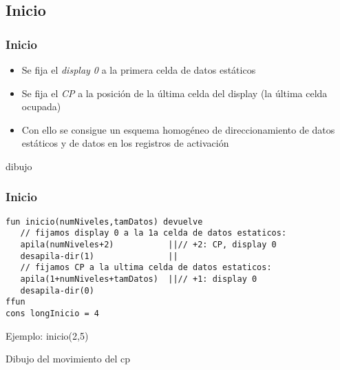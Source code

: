 \documentclass[hyperref={pdfpagelabels=false},tree-dvips]{beamer}
\begin{document}
\subsection{Inicio}
\begin{frame}[fragile]
\frametitle{Inicio}

\begin{itemize}[<+->]%
    \item Se fija el \emph{display 0} a la primera celda de datos estáticos
    \item Se fija el \emph{CP} a la posición de la última celda del display (la última celda ocupada)
    \item Con ello se consigue un esquema homogéneo de direccionamiento de datos estáticos y de datos en los registros de activación
\end{itemize}

dibujo

\end{frame}
\begin{frame}[fragile]
\frametitle{Inicio}
\begin{lstlisting}[style=codigoMP]
fun inicio(numNiveles,tamDatos) devuelve
   // fijamos display 0 a la 1a celda de datos estaticos:
   apila(numNiveles+2)           ||// +2: CP, display 0
   desapila-dir(1)               ||
   // fijamos CP a la ultima celda de datos estaticos:
   apila(1+numNiveles+tamDatos)  ||// +1: display 0
   desapila-dir(0)
ffun
cons longInicio = 4
\end{lstlisting}

Ejemplo: inicio(2,5)

Dibujo del movimiento del cp

\end{frame}
\end{document}
